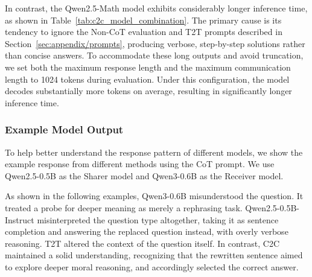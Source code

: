  In contrast, the Qwen2.5-Math model exhibits considerably longer inference time, as shown in Table~\ref{tab:c2c_model_combination}. The primary cause is its tendency to ignore the Non-CoT evaluation and T2T prompts described in Section~\ref{sec:appendix/prompts}, producing verbose, step-by-step solutions rather than concise answers. To accommodate these long outputs and avoid truncation, we set both the maximum response length and the maximum communication length to 1024 tokens during evaluation. Under this configuration, the model decodes substantially more tokens on average, resulting in significantly longer inference time.


\subsubsection{Example Model Output}
\label{sec:appendix/Example}

To help better understand the response pattern of different models, we show the example response from different methods using the CoT prompt.
We use Qwen2.5-0.5B as the Sharer model and Qwen3-0.6B as the Receiver model.

As shown in the following examples, Qwen3-0.6B misunderstood the question. It treated a probe for deeper meaning as merely a rephrasing task. Qwen2.5-0.5B-Instruct misinterpreted the question type altogether, taking it as sentence completion and answering the replaced question instead, with overly verbose reasoning. T2T altered the context of the question itself. In contrast, C2C maintained a solid understanding, recognizing that the rewritten sentence aimed to explore deeper moral reasoning, and accordingly selected the correct answer.

